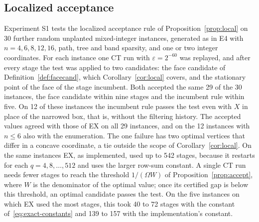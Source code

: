 \subsection{Localized acceptance}\label{sec:comp-localized}
Experiment S1 tests the localized acceptance rule of
Proposition~\ref{prop:local} on 30 further random unplanted mixed-integer
instances, generated as in E4 with $n=4,6,8,12,16$, path, tree and band
sparsity, and one or two integer coordinates. For each instance one CT run with
$\varepsilon=2^{-60}$ was replayed, and after every stage the test was
applied to two candidates: the face candidate of
Definition~\ref{def:facecand}, which Corollary~\ref{cor:local} covers, and
the stationary point of the face of the stage incumbent. Both accepted the
same 29 of the 30 instances, the face candidate within nine stages and the
incumbent rule within five. On 12 of these instances the incumbent rule
passes the test even with $X$ in place of the narrowed box, that is, without
the filtering history. The accepted values agreed with those of EX on all 29
instances, and on the 12 instances with $n\le6$ also with the enumeration.
The one failure has two optimal vertices that differ in a concave
coordinate, a tie outside the scope of Corollary~\ref{cor:local}. On the same
instances EX, as implemented, used up to 542 stages, because it restarts for
each $q=4,8,\dots,512$ and uses the larger row-sum constant. A single CT run
needs fewer stages to reach the threshold $1/(\Omega W)$ of
Proposition~\ref{prop:accept}, where $W$ is the denominator of the optimal
value; once its certified gap is below this threshold, an optimal candidate
passes the test. On the five instances on which EX used the most stages, this
took 40 to 72 stages with the constant of~\eqref{eq:exact-constants} and 139
to 157 with the implementation's constant.

